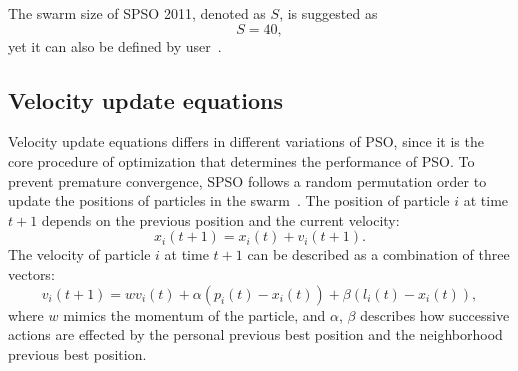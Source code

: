 The swarm size of SPSO 2011, denoted as $S$, is suggested as
\begin{displaymath}
S = 40,
\end{displaymath}
yet it can also be defined by user~\cite{Clerc:2012:SPSO2011}.


\subsection{Velocity update equations}

Velocity update equations differs in different variations of PSO, 
since it is the core procedure of optimization that determines the performance of PSO.
To prevent premature convergence, 
SPSO follows a random permutation order to update the positions of particles in the swarm~\cite{Clerc:2012:SPSO2011}.
The position of particle $i$ at time $t+1$ depends on the previous position and the current velocity:
\begin{displaymath}
x_i(t+1) = x_i(t) + v_i(t+1).
\end{displaymath}
The velocity of particle $i$ at time $t+1$ can be described as a combination of three vectors:
\begin{displaymath}
v_i(t+1) = w v_i(t) + \alpha (p_i(t) - x_i(t)) + \beta (l_i(t) - x_i(t)),
\end{displaymath}
where $w$ mimics the momentum of the particle, and $\alpha$, $\beta$ describes how successive actions are effected by the personal previous best position and the neighborhood previous best position.


